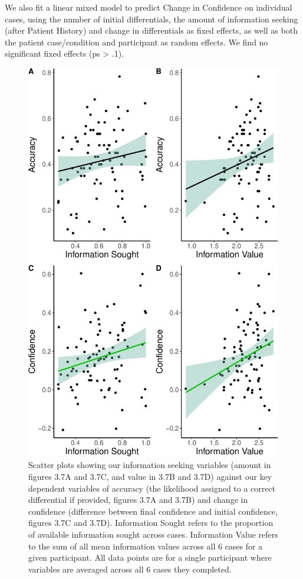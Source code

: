 \documentclass[a4paper, nobind]{templates/ociamthesis}
\begin{document}
\hfill\break
We also fit a linear mixed model to predict Change in Confidence on individual cases, using the number of initial differentials, the amount of information seeking (after Patient History) and change in differentials as fixed effects, as well as both the patient case/condition and participant as random effects. We find no significant fixed effects (ps \textgreater{} .1).

\newpage

\begin{figure}[H]

{\centering \includegraphics[width=1\linewidth]{_main_files/figure-latex/confAccPlot-1} 

}

\caption{Scatter plots showing our information seeking variables (amount in figures 3.7A and 3.7C, and value in 3.7B and 3.7D) against our key dependent variables of accuracy (the likelihood assigned to a correct differential if provided, figures 3.7A and 3.7B) and change in confidence (difference between final confidence and initial confidence, figures 3.7C and 3.7D). Information Sought refers to the proportion of available information sought across cases. Information Value refers to the sum of all mean information values across all 6 cases for a given participant. All data points are for a single participant where variables are averaged across all 6 cases they completed.}\label{fig:confAccPlot}
\end{figure}
\end{document}
